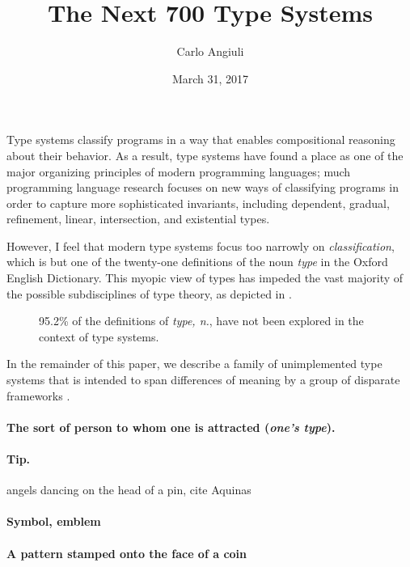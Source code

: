 \documentclass[10pt]{article}
\title{The Next 700 Type Systems}
\author{Carlo Angiuli}
\date{March 31, 2017}
\newcommand{\slice}[3]{
  \draw[thick,fill=#3] (0,0) -- (#1:1) arc (#1:#2:1) -- cycle;
}
\begin{document}
\maketitle

Type systems classify programs in a way that enables compositional reasoning
about their behavior. As a result, type systems have found a place as one of the
major organizing principles of modern programming languages; much programming
language research focuses on new ways of classifying programs in order to
capture more sophisticated invariants, including dependent, gradual, refinement,
linear, intersection, and existential types.

However, I feel that modern type systems focus too narrowly on
\emph{classification}, which is but one of the twenty-one definitions of the
noun \emph{type} in the Oxford English Dictionary. This myopic view of types has
impeded the vast majority of the possible subdisciplines of type theory, as
depicted in .

\begin{figure}[b]
\centering
{}
\caption{95.2\% of the definitions of \emph{type, n.}, have not been explored in
the context of type systems.}
\label{fig:pie-chart}
\end{figure}

In the remainder of this paper, we describe a family of unimplemented type
systems that is intended to span differences of meaning by a group of disparate
frameworks \cite{landin66}.

\paragraph{The sort of person to whom one is attracted (\emph{one's type}).}

\paragraph{Tip.}

angels dancing on the head of a pin, cite Aquinas

\paragraph{Symbol, emblem}

\paragraph{A pattern stamped onto the face of a coin}
\end{document}
